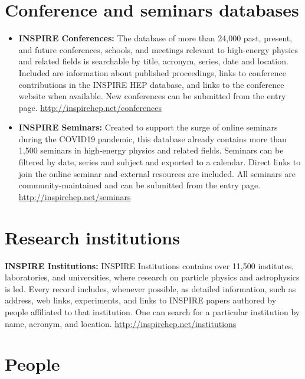 \section{Conference and seminars databases}\label{databases:sec:conference}
\begin{itemize}
\tightlist
{}
\item
  \textbf{INSPIRE Conferences:} The database of more than 24,000 past,
  present, and future conferences, schools, and meetings relevant to
  high-energy physics and related fields is searchable by title,
  acronym, series, date and location. Included are information about
  published proceedings, links to conference contributions in the
  INSPIRE HEP database, and links to the conference website when
  available. New conferences can be submitted from the entry page.
  \url{http://inspirehep.net/conferences}
\item
  \textbf{INSPIRE Seminars:} Created to support the surge of online seminars during
  the COVID19 pandemic, this database already contains more than 1,500
  seminars in high-energy physics and related fields. Seminars can be filtered
  by date, series and subject and exported to a calendar. Direct links to join
  the online seminar and external resources are included. All seminars are
  community-maintained and can be submitted from the entry page.
  \url{http://inspirehep.net/seminars}
\end{itemize}

\section{Research institutions}\label{databases:sec:research}

  \textbf{INSPIRE Institutions:} INSPIRE Institutions contains over
  11,500 institutes, laboratories, and universities, where research on
  particle physics and astrophysics is led. Every record includes,
  whenever possible, as detailed information, such as address, web
  links, experiments, and links to INSPIRE papers authored by people
  affiliated to that institution. One can search for a particular
  institution by name, acronym, and location.
  \url{http://inspirehep.net/institutions}

\section{People}\label{databases:sec:people}

